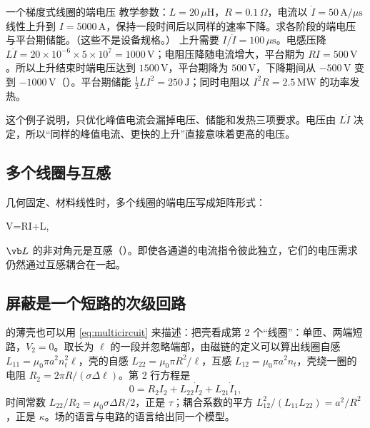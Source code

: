 \begin{example}{一个梯度式线圈的端电压}\label{ex:eddy-voltage}
教学参数：$L=20\,\mu\mathrm H$，$R=0.1\,\Omega$，电流以 $\dot I=50\,\mathrm{A}/\mu\mathrm{s}$ 线性上升到 $I=5000\,\mathrm A$，保持一段时间后以同样的速率下降。求各阶段的端电压与平台期储能。（这些不是设备规格。）
\solution
上升需要 $I/\dot I=100\,\mu\mathrm s$。电感压降 $L\dot I=20\times10^{-6}\times5\times10^7=1000\,\mathrm V$；电阻压降随电流增大，平台期为 $RI=500\,\mathrm V$。所以上升结束时端电压达到 $1500\,\mathrm V$，平台期降为 $500\,\mathrm V$，下降期间从 $-500\,\mathrm V$ 变到 $-1000\,\mathrm V$（）。平台期储能 $\tfrac12LI^2=250\,\mathrm J$；同时电阻以 $I^2R=2.5\,\mathrm{MW}$ 的功率发热。
\end{example}


这个例子说明，只优化峰值电流会漏掉电压、储能和发热三项要求。电压由 $L\dot I$ 决定，所以“同样的峰值电流、更快的上升”直接意味着更高的电压。

\subsection{多个线圈与互感}
几何固定、材料线性时，多个线圈的端电压写成矩阵形式：
\begin{keyeq}
\boldsymbol V=\vb R\boldsymbol I+\vb L,
\label{eq:multicircuit}
\end{keyeq}
$\vb L$ 的非对角元是互感（）。即使各通道的电流指令彼此独立，它们的电压需求仍然通过互感耦合在一起。

\subsection{屏蔽是一个短路的次级回路}
 的薄壳也可以用 \eqref{eq:multicircuit} 来描述：把壳看成第 2 个“线圈”：单匝、两端短路，$V_2=0$。取长为 $\ell$ 的一段并忽略端部，由磁链的定义可以算出线圈自感 $L_{11}=\mu_0\pi a^2n_t^2\ell$，壳的自感 $L_{22}=\mu_0\pi R^2/\ell$，互感 $L_{12}=\mu_0\pi a^2n_t$，壳绕一圈的电阻 $R_2=2\pi R/(\sigma\Delta\ell)$。第 2 行方程是
\begin{equation}
0=R_2I_2+L_{22}\dot I_2+L_{21}\dot I_1 ,
\end{equation}
时间常数 $L_{22}/R_2=\mu_0\sigma\Delta R/2$，正是 $\tau$；耦合系数的平方 $L_{12}^2/(L_{11}L_{22})=a^2/R^2$，正是 $\kappa$。场的语言与电路的语言给出同一个模型。

